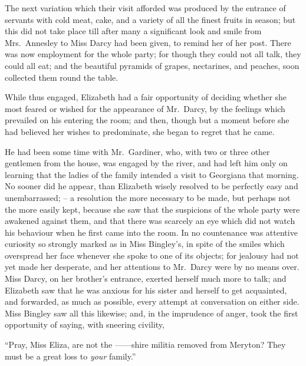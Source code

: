 The next variation which their visit afforded was produced
by the entrance of servants with cold meat, cake,
and a variety of all the finest fruits in season; but this
did not take place till after many a significant look and
smile from Mrs.\ Annesley to Miss Darcy had been given,
to remind her of her post. There was now employment
for the whole party; for though they could not all talk,
they could all eat; and the beautiful pyramids of grapes,
nectarines, and peaches, soon collected them round the
table.

While thus engaged, Elizabeth had a fair opportunity
of deciding whether she most feared or wished for the
appearance of Mr.\ Darcy, by the feelings which prevailed
on his entering the room; and then, though but a moment
before she had believed her wishes to predominate, she
began to regret that he came.

He had been some time with Mr.\ Gardiner, who, with
two or three other gentlemen from the house, was engaged
by the river, and had left him only on learning that the
ladies of the family intended a visit to Georgiana that
morning. No sooner did he appear, than Elizabeth wisely
resolved to be perfectly easy and unembarrassed; --
a resolution the more necessary to be made, but perhaps
not the more easily kept, because she saw that the suspicions
of the whole party were awakened against them,
and that there was scarcely an eye which did not watch
his behaviour when he first came into the room. In no
countenance was attentive curiosity so strongly marked
as in Miss Bingley’s, in spite of the smiles which overspread
her face whenever she spoke to one of its objects; for
jealousy had not yet made her desperate, and her attentions
to Mr.\ Darcy were by no means over. Miss Darcy,
on her brother’s entrance, exerted herself much more to
talk; and Elizabeth saw that he was anxious for his
sister and herself to get acquainted, and forwarded, as
much as possible, every attempt at conversation on either
side. Miss Bingley saw all this likewise; and, in the
imprudence of anger, took the first opportunity of saying,
with sneering civility,

“Pray, Miss Eliza, are not the ------shire militia removed
from Meryton? They must be a great loss to \textit{your}
family.”

